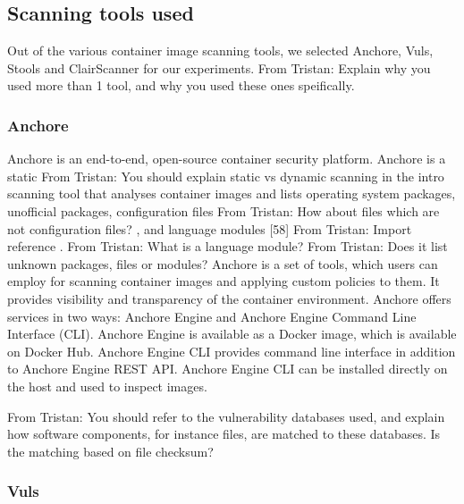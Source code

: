 \documentclass[a4paper,num-refs]{oup-contemporary}
\newcommand{\TG}[1]{\color{blue}From Tristan: #1 \color{black}}
\begin{document}
\subsection{Scanning tools used}

Out of the various container image scanning tools, we selected Anchore,
Vuls, Stools and ClairScanner for our experiments. \TG{Explain why you used
more than 1 tool, and why you used these ones speifically.}

\subsubsection{Anchore}

Anchore is an end-to-end, open-source container security platform. Anchore
is a static \TG{You should explain static vs dynamic scanning in the intro}
scanning tool that analyses container images and lists operating system
packages, unofficial packages, configuration files \TG{How about files
which are not configuration files?}, and language modules [58] \TG{Import
reference}. \TG{What is a language module?} \TG{Does it list unknown
packages, files or modules?} Anchore is a set of tools, which users can
employ for scanning container images and applying custom policies to them.
It provides visibility and transparency of the container environment.
Anchore offers services in two ways: Anchore Engine and Anchore Engine
Command Line Interface (CLI). Anchore Engine is available as a Docker
image, which is available on Docker Hub. Anchore Engine CLI provides
command line interface in addition to Anchore Engine REST API. Anchore
Engine CLI can be installed directly on the host and used to inspect
images.

\TG{You should refer to the vulnerability databases used, and explain how
software components, for instance files, are matched to these databases. Is
the matching based on file checksum?}

\subsubsection{Vuls}
\end{document}
